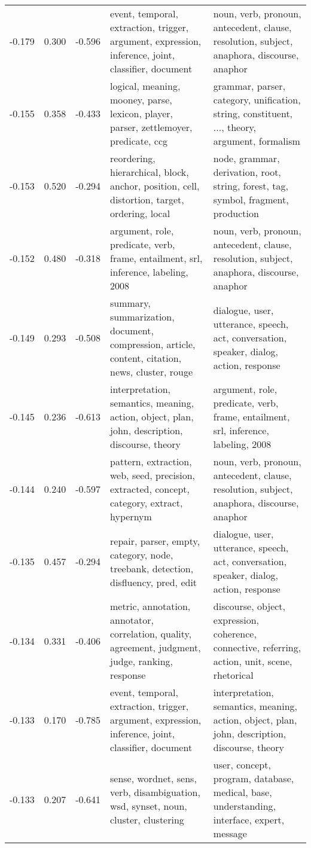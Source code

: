 \begin{tabular}{cccp{5cm}p{5cm}}
-0.179 & 0.300 & -0.596 & event, temporal, extraction, trigger, argument, expression, inference, joint, classifier, document & noun, verb, pronoun, antecedent, clause, resolution, subject, anaphora, discourse, anaphor \\
-0.155 & 0.358 & -0.433 & logical, meaning, mooney, parse, lexicon, player, parser, zettlemoyer, predicate, ccg & grammar, parser, category, unification, string, constituent, ..., theory, argument, formalism \\
-0.153 & 0.520 & -0.294 & reordering, hierarchical, block, anchor, position, cell, distortion, target, ordering, local & node, grammar, derivation, root, string, forest, tag, symbol, fragment, production \\
-0.152 & 0.480 & -0.318 & argument, role, predicate, verb, frame, entailment, srl, inference, labeling, 2008 & noun, verb, pronoun, antecedent, clause, resolution, subject, anaphora, discourse, anaphor \\
-0.149 & 0.293 & -0.508 & summary, summarization, document, compression, article, content, citation, news, cluster, rouge & dialogue, user, utterance, speech, act, conversation, speaker, dialog, action, response \\
-0.145 & 0.236 & -0.613 & interpretation, semantics, meaning, action, object, plan, john, description, discourse, theory & argument, role, predicate, verb, frame, entailment, srl, inference, labeling, 2008 \\
-0.144 & 0.240 & -0.597 & pattern, extraction, web, seed, precision, extracted, concept, category, extract, hypernym & noun, verb, pronoun, antecedent, clause, resolution, subject, anaphora, discourse, anaphor \\
-0.135 & 0.457 & -0.294 & repair, parser, empty, category, node, treebank, detection, disfluency, pred, edit & dialogue, user, utterance, speech, act, conversation, speaker, dialog, action, response \\
-0.134 & 0.331 & -0.406 & metric, annotation, annotator, correlation, quality, agreement, judgment, judge, ranking, response & discourse, object, expression, coherence, connective, referring, action, unit, scene, rhetorical \\
-0.133 & 0.170 & -0.785 & event, temporal, extraction, trigger, argument, expression, inference, joint, classifier, document & interpretation, semantics, meaning, action, object, plan, john, description, discourse, theory \\
-0.133 & 0.207 & -0.641 & sense, wordnet, sens, verb, disambiguation, wsd, synset, noun, cluster, clustering & user, concept, program, database, medical, base, understanding, interface, expert, message \\

\end{tabular}
